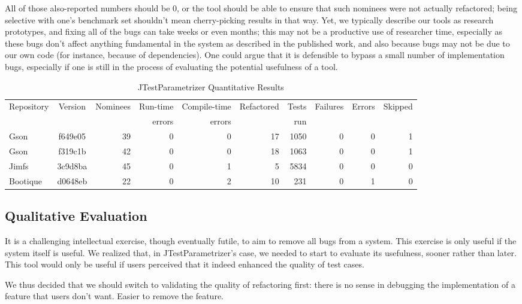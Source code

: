 All of those also-reported numbers should be 0, or the tool should be
able to ensure that such nominees were not actually refactored; being
selective with one's benchmark set shouldn't mean cherry-picking
results in that way. Yet, we typically describe our tools as research
prototypes, and fixing all of the bugs can take weeks or even months;
this may not be a productive use of researcher time, especially as
these bugs don't affect anything fundamental in the system as
described in the published work, and also because bugs may not be due
to our own code (for instance, because of dependencies).  One could
argue that it is defensible to bypass a small number of implementation
bugs, especially if one is still in the process of evaluating
the potential usefulness of a tool.

\begin{table*}[h!]
\centering
\begin{tabular}{l c r r r r r r r r} 
 Repository & Version & Nominees & Run-time  & Compile-time  & Refactored & Tests & Failures & Errors & Skipped \\
  &  &  & errors & errors &  & run &  &  &  \\ [0.75ex]
 \hline\hline
 Gson & f649e05 & 39 & 0 & 0 & 17 & 1050 & 0 & 0 & 1 \\ 
 Gson & f319c1b & 42 & 0 & 0 & 18 & 1063 & 0 & 0 & 1 \\ 
 Jimfs & 3c9d8ba & 45 & 0 & 1 & 5 & 5834 & 0 & 0 & 0 \\ 
 Bootique & d0648eb & 22 & 0 & 2 & 10 & 231 & 0 & 1 & 0 \\ 
\end{tabular}
\caption{JTestParametrizer Quantitative Results}
\label{table:quantitative_results}
\end{table*}

\subsection{Qualitative Evaluation}
It is a challenging intellectual exercise, though eventually futile,
to aim to remove all bugs from a system. This exercise is only useful
if the system itself is useful. We realized that, in JTestParametrizer's
case, we needed to start to evaluate its usefulness, sooner rather than later.
This tool would only be useful if users perceived that it indeed enhanced the
quality of test cases.

We thus decided that we should switch to validating the quality of
refactoring first: there is no sense in debugging the implementation of a feature
that users don't want. Easier to remove the feature.

